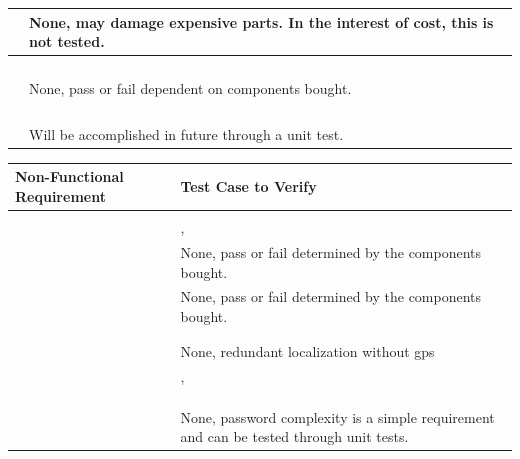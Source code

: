 \documentclass[12pt, titlepage]{article}
\begin{document}
\begin{table}[!h]
\begin{center}
\begin{tabular}{ | m{3cm} | m{12cm} | }
\nameref{MTNC_003} & None, may damage expensive parts. In the interest of cost, this is not tested. \\ \hline
\nameref{SAFE_001} & \nameref{tab:STC_021} \\ \hline
\nameref{SAFE_002} & \nameref{tab:STC_002} \\ \hline
\nameref{SAFE_003} & \nameref{tab:STC_018} \\ \hline
\nameref{SAFE_004} & \nameref{tab:STC_021} \\ \hline
\nameref{SAFE_005} & None, pass or fail dependent on components bought. \\ \hline
\nameref{USE_001} & \nameref{tab:STC_004} \\ \hline
\nameref{USE_002} & \nameref{tab:STC_022} \\ \hline
\nameref{USE_003} & \nameref{tab:STC_006} \\ \hline
\nameref{USE_004} & \nameref{tab:STC_017} \\ \hline
\nameref{USE_005} & Will be accomplished in future through a unit test. \\ \hline
\end{tabular}
\end{center}
\end{table}


\begin{table}[!h]
\begin{center}
\begin{tabular}{ | m{8cm} | m{8cm} | } 
\hline
Non-Functional Requirement & Test Case to Verify \\
\hline
\nameref{SR_002} & \nameref{tab:STC_018} \\ \hline
\nameref{SR_003} & \nameref{tab:STC_005}, \nameref{tab:STC_006} \\ \hline
\nameref{SR_004} & None, pass or fail determined by the components bought. \\ \hline
\nameref{SR_005} & None, pass or fail determined by the components bought. \\ \hline
\nameref{SR_006} & \nameref{tab:STC_018} \\ \hline
\nameref{SR_007} & \nameref{tab:STC_010} \\ \hline
\nameref{SR_008} & None, redundant localization without gps \\ \hline
\nameref{SR_009} & \nameref{tab:STC_015}, \nameref{tab:STC_014} \\ \hline
\nameref{SR_010} & \nameref{tab:STC_018} \\ \hline
\nameref{SR_011} & \nameref{tab:STC_006} \\ \hline
\nameref{SR_012} & \nameref{tab:STC_007} \\ \hline
\nameref{SR_013} & None, password complexity is a simple requirement and can be tested through unit tests. \\ \hline
\end{tabular}
\end{center}
\end{table}
\end{document}
